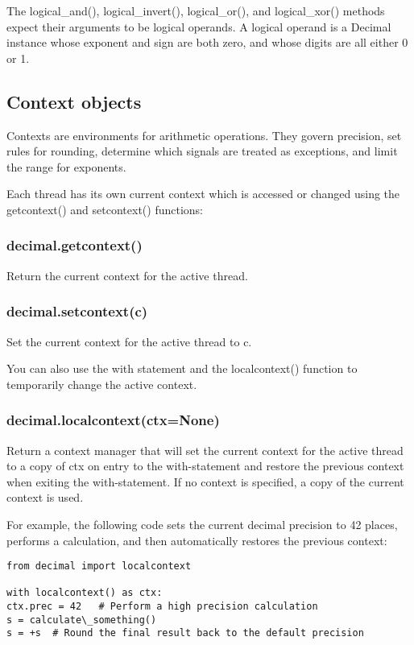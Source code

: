 The logical\_and(), logical\_invert(), logical\_or(), and logical\_xor() methods expect their arguments to be logical operands. A logical operand is a Decimal instance whose exponent and sign are both zero, and whose digits are all either 0 or 1.


\subsection{Context objects}


Contexts are environments for arithmetic operations. They govern precision, set rules for rounding, determine which signals are treated as exceptions, and limit the range for exponents.

Each thread has its own current context which is accessed or changed using the getcontext() and setcontext() functions:


\subsubsection{decimal.getcontext()}

Return the current context for the active thread.

\subsubsection{decimal.setcontext(c)}

Set the current context for the active thread to c.

You can also use the with statement and the localcontext() function to temporarily change the active context.

\subsubsection{decimal.localcontext(ctx=None)}

Return a context manager that will set the current context for the active thread to a copy of ctx on entry to the with-statement and restore the previous context when exiting the with-statement. If no context is specified, a copy of the current context is used.

\vpara
For example, the following code sets the current decimal precision to 42 places, performs a calculation, and then automatically restores the previous context:

\begin{lstlisting}
from decimal import localcontext

with localcontext() as ctx:
ctx.prec = 42   # Perform a high precision calculation
s = calculate\_something()
s = +s  # Round the final result back to the default precision
\end{lstlisting}

